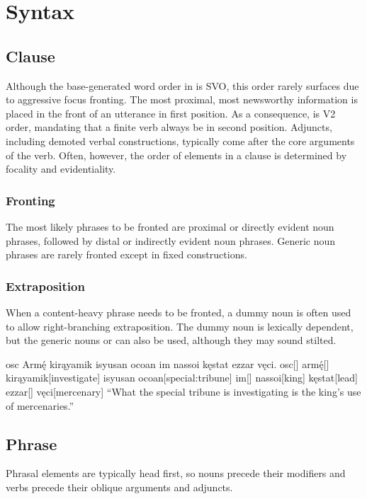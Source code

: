 \setchapterpreamble[u]{\margintoc}
\chapter{Syntax}
\section{Clause}
Although the base-generated word order in \langname{} is SVO, this order rarely surfaces due to aggressive focus fronting. The most proximal, most newsworthy information is placed in the front of an utterance in first position. As a consequence, \langname{} is V2 order, mandating that a finite verb always be in second position. Adjuncts, including demoted verbal constructions, typically come after the core arguments of the verb.  Often, however, the order of elements in a clause is determined by focality and evidentiality.

\subsection{Fronting}
The most likely phrases to be fronted are proximal or directly evident noun phrases, followed by distal or indirectly evident noun phrases. Generic noun phrases are rarely fronted except in fixed constructions.

\subsection{Extraposition}
When a content-heavy phrase needs to be fronted, a dummy noun is often used to allow right-branching extraposition. The dummy noun is lexically dependent, but the generic nouns  or  can also be used, although they may sound stilted.

\begin{gloss*}
    \begingl
    \glpreamble osc Armę́ kirąyamik isyusan ocoan im nassoi kęstat ezzar vęci. \endpreamble
    osc[]
    armę́[]
    kirąyamik[investigate]
    {isyusan ocoan}[special:tribune]
    im[]
    nassoi[king]
    kęstat[lead]
    ezzar[]
    vęci[mercenary]
    \glft “What the special tribune is investigating is the king's use of mercenaries.”
    \endgl
\end{gloss*}


\section{Phrase}
Phrasal elements are typically head first, so nouns precede their modifiers and verbs precede their oblique arguments and adjuncts.
